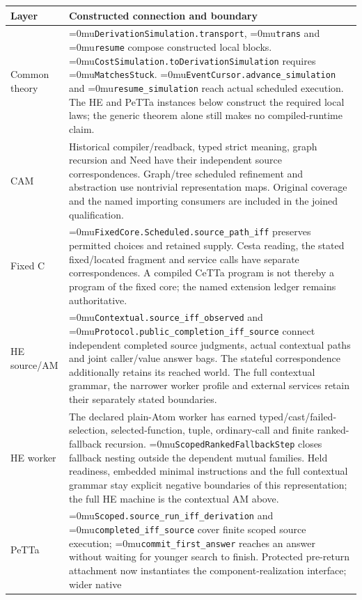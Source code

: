\documentclass[11pt,a4paper]{article}
\newcommand{\name}[1]{\textup{\Urlmuskip=0mu\relax\nolinkurl{#1}}}
\begin{document}
{\small
\begin{tabularx}{\linewidth}{@{}>{\raggedright\arraybackslash}p{27mm}>{\raggedright\arraybackslash}X@{}}
\toprule
Layer & Constructed connection and boundary \\
\midrule
Common theory &
\name{DerivationSimulation.transport}, \name{trans} and \name{resume}
compose constructed local blocks. \name{CostSimulation.toDerivationSimulation}
requires \name{MatchesStuck}. \name{EventCursor.advance_simulation} and
\name{resume_simulation} reach actual scheduled execution. The HE and PeTTa
instances below construct the required local laws; the generic theorem alone
still makes no compiled-runtime claim. \\
CAM &
Historical compiler/readback, typed strict meaning, graph recursion and Need
have their independent source correspondences. Graph/tree scheduled refinement
and abstraction use nontrivial representation maps. Original coverage and
the named importing consumers are included in the joined qualification. \\
Fixed C &
\name{FixedCore.Scheduled.source_path_iff} preserves permitted choices and
retained supply. Cesta reading, the stated fixed/located fragment and service
calls have separate correspondences. A compiled CeTTa program is not thereby
a program of the fixed core; the named extension ledger remains authoritative.
\\
HE source/AM &
\name{Contextual.source_iff_observed} and
\name{Protocol.public_completion_iff_source} connect independent completed
source judgments, actual contextual paths and joint caller/value answer bags.
The stateful correspondence additionally retains its reached world. The full
contextual grammar, the narrower worker profile and external services retain
their separately stated boundaries. \\
HE worker &
The declared plain-Atom worker has earned typed/cast/failed-selection,
selected-function, tuple, ordinary-call and finite ranked-fallback recursion.
\name{ScopedRankedFallbackStep} closes fallback nesting outside the dependent
mutual families. Held readiness, embedded minimal instructions and the full
contextual grammar stay explicit negative boundaries of this representation;
the full HE machine is the contextual AM above. \\
PeTTa &
\name{Scoped.source_run_iff_derivation} and \name{completed_iff_source}
cover finite scoped source execution; \name{commit_first_answer} reaches an
answer without waiting for younger search to finish. Protected pre-return
attachment now instantiates the component-realization interface; wider native

\end{tabularx}}
\end{document}
